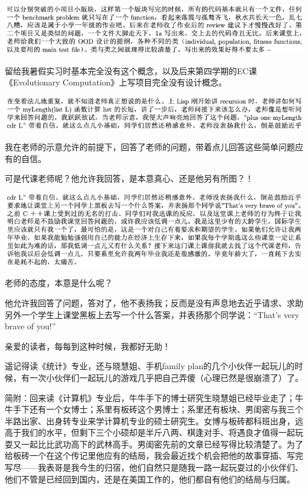 \documentclass[9pt, b5paper]{article}
\begin{document}
\begin{center}
\includegraphics[width=.9\linewidth]{./pic/backups_plans_20210425_151137.png}
\end{center}

留给我暑假实习时基本完全没有这个概念，以及后来第四学期的EC课《Evolutionary Computation》上写项目完全没有设计概念。

\begin{center}
\includegraphics[width=.9\linewidth]{./pic/backups_plans_20210424_204032.png}
\end{center}

我在老师的示意允许的前提下，回答了老师的问题，带着点儿回答这些简单问题应有的自信。

可是代课老师呢？他允许我回答，是本意真心、还是他另有所图？！

\begin{center}
\includegraphics[width=.9\linewidth]{./pic/backups_plans_20210424_204405.png}
\end{center}

老师的态度，本意是什么呢？

他允许我回答了问题，答对了，他不表扬我；反而是没有声息地去近乎请求、求助另外一个学生上课堂黑板上去写一个什么答案，并表扬那个同学说：“That's very brave of you!”

亲爱的读者，每每到这种时候，我都好无助！

遥记得读《统计》专业，还与晓慧姐、手机family plan的几个小伙伴一起玩儿的时候，有一次小伙伴们一起玩儿的游戏几乎把自己弄傻（心理已然是很崩溃了）了。

简附：回来读《计算机》专业后，牛牛手下的博士研究生晓慧姐已经毕业走了；牛牛手下还有一个女博士；系里有板砖这个男博士；系里还有板块、男闺密与我三个半路出家、出身转专业来学计算机专业的硕士研究生。女博与板砖都科班出身，远高于我们的水平，但剩下三个小硕却是半斤八两、棋逢对手、将遇良才值得一起玩耍又一起比比武功高下的武林高手。男闺密先前的文章已经写得比较清楚了。为了给板砖一个在这个传记里他应有的结局，我会最近找个机会把他的故事穿插、写完写尽——我表哥是我今生的归宿，他们自然只是随我一路一起玩耍过的小伙伴们、他们不管是已经回到国内，还是在美国工作的，他们都自有他们的结局与归属。 
\end{document}
